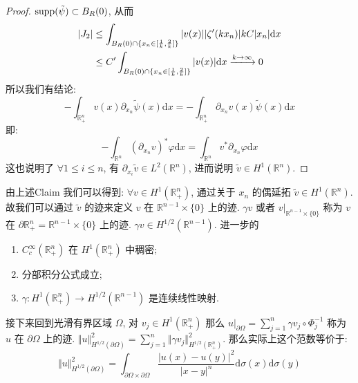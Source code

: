 \documentclass[11pt]{ctexart}[UTF8]
\begin{document}
\begin{proof}
    $\operatorname{supp}(\tilde{\psi}) \subset B_{R}(0)$, 从而
    \begin{equation*}
        \begin{aligned}
            |J_{2}| &\leq \int_{B_{R}(0) \cap \{x_n \in [\frac{1}{k},\frac{2}{k}]\}} |v(x)| |\zeta'(kx_n)| k C|x_{n}| \mathrm{d}x\\
                    &\leq C' \int_{B_{R}(0) \cap \{x_n \in [\frac{1}{k},\frac{2}{k}]\}} |v(x)| \mathrm{d}x \xlongrightarrow{k \to \infty} 0
        \end{aligned}
    \end{equation*}
    所以我们有结论: 
    \begin{equation*}
        -\int_{\mathbb{R}^{n}_{+}} v(x)\partial_{x_n}\tilde{\psi}(x) \mathrm{d}x = -\int_{\mathbb{R}^{n}_{+}} \partial_{x_n}v(x)\tilde{\psi}(x) \mathrm{d}x
    \end{equation*}
    即:
    \begin{equation*}
        -\int_{\mathbb{R}^{n}} (\partial_{x_n}v)^{*} \varphi \mathrm{d}x = \int_{\mathbb{R}^{n}}v^{*} \partial_{x_n}\varphi \mathrm{d}x
    \end{equation*}
    这也说明了 $\forall 1 \leq i \leq n$, 有 $\partial_{x_i}\tilde{v} \in L^{2}(\mathbb{R}^n)$, 进而说明 $\tilde{v} \in H^{1}(\mathbb{R}^n)$.
\end{proof}
由上述Claim 我们可以得到: $\forall v \in H^{1}(\mathbb{R}^n_{+})$, 通过关于 $x_{n}$ 的偶延拓 $\tilde{v} \in H^{1}(\mathbb{R}^n)$. 故我们可以通过 $\tilde{v}$ 的迹来定义 $v$ 在 $\mathbb{R}^{n-1}\times \{0\}$ 上的迹. 
$\gamma v$ 或者 $v|_{\mathbb{R}^{n-1}\times \{0\}}$ 称为 $v$ 在 $\partial \mathbb{R}^{n}_{+} = \mathbb{R}^{n-1}\times \{0\}$ 上的迹. $\gamma v \in H^{1/2}(\mathbb{R}^{n-1})$. 进一步的
\begin{enumerate}
    \item $C_{c}^{\infty}(\mathbb{R}^n_{+})$ 在 $H^{1}(\mathbb{R}^n_{+})$ 中稠密;
    \item 分部积分公式成立;
    \item $ \gamma: H^{1}(\mathbb{R}^n_{+}) \longrightarrow H^{1/2}(\mathbb{R}^{n-1}) $ 是连续线性映射.
\end{enumerate}
接下来回到光滑有界区域 $\Omega$, 对 $v_{j}\in H^{1}(\mathbb{R}^{n}_{+})$ 那么 $u|_{\partial \Omega} = \sum\limits_{j=1}^{n} \gamma v_j \circ \Phi_j^{-1}$ 称为
$u$ 在 $\partial \Omega$ 上的迹. $\Vert u \Vert_{H^{1/2}(\partial \Omega)}^{2} = \sum\limits_{j=1}^{n} \Vert \gamma v_j  \Vert_{H^{1/2}(\mathbb{R}^{n}_{+})}^{2}$. 
那么实际上这个范数等价于:
\begin{equation*}
    \Vert u \Vert_{H^{1/2}(\partial \Omega)}^{2} = \int_{\partial \Omega \times \partial \Omega} \frac{|u(x)-u(y)|^2}{|x-y|^n} \mathrm{d}\sigma(x)\mathrm{d}\sigma(y) 
\end{equation*}
\end{document}
